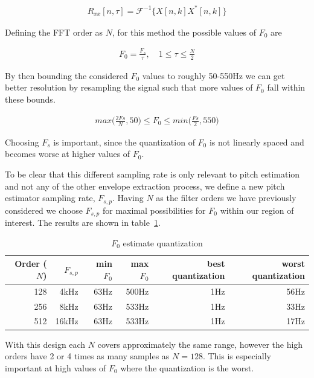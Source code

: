 \documentclass [11pt, proquest,oneside] {uwthesis}[2015/03/03]
\begin{document}
\begin{align}
R_{xx}[n,\tau] = \mathcal{F}^{-1}\Big\{X[n,k]X^*[n,k]\Big\}
\end{align}

Defining the FFT order as $N$, for this method the possible values of $F_0$ are 

\begin{align}
F_0 = \frac{F_s}{\tau}, \quad 1 \leq \tau \leq \frac{N}{2}
\end{align}

By then bounding the considered $F_0$ values to roughly 50-550Hz we can get better resolution by resampling the signal such that more values of $F_0$ fall within these bounds.

\begin{align}
max\Big(\frac{2Fs}{N}, 50\Big) \leq F_0 \leq min\Big(\frac{Fs}{2}, 550\Big)
\end{align}

Choosing $F_s$ is important, since the quantization of $F_0$ is not linearly spaced and becomes worse at higher values of $F_0$.

To be clear that this different sampling rate is only relevant to pitch estimation and not any of the other envelope extraction process, we define a new pitch estimator sampling rate, $F_{s,p}$.  Having $N$ as the filter orders we have previously considered we choose $F_{s,p}$ for maximal possibilities for $F_0$ within our region of interest.  The results are shown in table~\ref{table:f0_quantization}.

\begin{table}
\begin{center}
\begin{tabular}{| r | r | r | r | r | r |}
  \hline
  \textbf{Order ($N$)} & \textbf{$F_{s,p}$} &  \textbf{min $F_0$} & \textbf{max $F_0$} &  \textbf{best quantization} &  \textbf{worst quantization} \\ \hline
  128 & 4kHz & 63Hz & 500Hz & 1Hz & 56Hz \\ \hline
  256 & 8kHz & 63Hz & 533Hz & 1Hz & 33Hz \\ \hline
  512 & 16kHz & 63Hz & 533Hz & 1Hz & 17Hz \\ \hline
\end{tabular}
\end{center}
\caption{$F_0$ estimate quantization}\label{table:f0_quantization}
\end{table}

With this design each $N$ covers approximately the same range, however the high orders have 2 or 4 times as many samples as $N = 128$.  This is especially important at high values of $F_0$ where the quantization is the worst.
\end{document}
